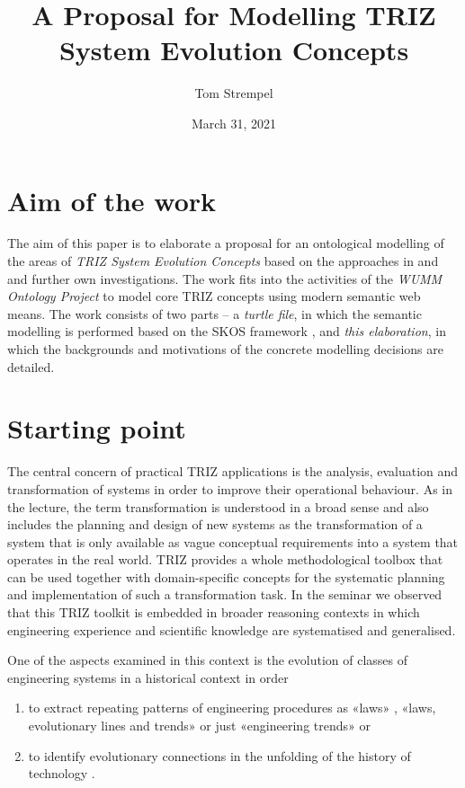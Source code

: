 \documentclass[11pt,a4paper]{article}
\title{A Proposal for Modelling TRIZ System Evolution Concepts}
\author{Tom Strempel}
\date{March 31, 2021}
\begin{document}
\maketitle

\section{Aim of the work}

The aim of this paper is to elaborate a proposal for an ontological modelling
of the areas of \emph{TRIZ System Evolution Concepts} based on the approaches
in \cite{TESE2018} and \cite{Shpakovsky2016} and further own investigations.
The work fits into the activities of the \emph{WUMM Ontology Project}
\cite{WUMM} to model core TRIZ concepts using modern semantic web means.  The
work consists of two parts -- a \emph{turtle file}, in which the semantic
modelling is performed based on the SKOS framework \cite{SKOS}, and \emph{this
  elaboration}, in which the backgrounds and motivations of the concrete
modelling decisions are detailed.

\section{Starting point} 

The central concern of practical TRIZ applications is the analysis, evaluation
and transformation of systems in order to improve their operational behaviour.
As in the lecture, the term transformation is understood in a broad sense and
also includes the planning and design of new systems as the transformation of
a system that is only available as vague conceptual requirements into a system
that operates in the real world. TRIZ provides a whole methodological toolbox
that can be used together with domain-specific concepts for the systematic
planning and implementation of such a transformation task. In the seminar we
observed that this TRIZ toolkit is embedded in broader reasoning contexts in
which engineering experience and scientific knowledge are systematised and
generalised.

One of the aspects examined in this context is the evolution of classes of
engineering systems in a historical context in order 
\begin{enumerate}
\item to extract repeating patterns of engineering procedures as «laws»
  \cite{Altshuller1979}, «laws, evolutionary lines and trends» \cite{KS} or
  just «engineering trends» \cite{TESE2018} or
\item to identify evolutionary connections in the unfolding of the history of
  technology \cite{Shpakovsky2016}.
\end{enumerate}
\end{document}
